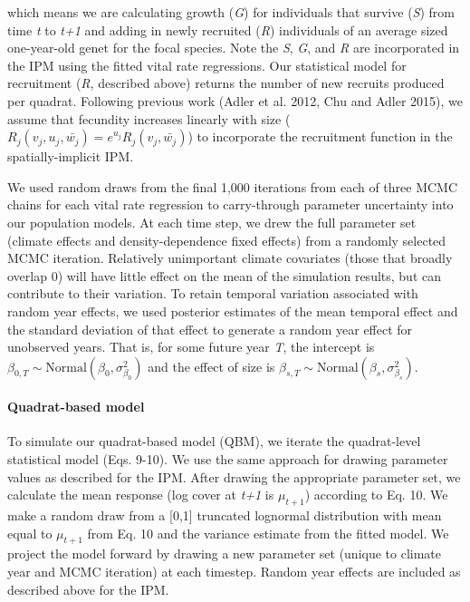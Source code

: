 \documentclass[12pt,]{article}
\begin{document}
which means we are calculating growth (\emph{G}) for individuals that
survive (\emph{S}) from time \emph{t} to \emph{t+1} and adding in newly
recruited (\emph{R}) individuals of an average sized one-year-old genet
for the focal species. Note the \emph{S}, \emph{G}, and \emph{R} are
incorporated in the IPM using the fitted vital rate regressions. Our
statistical model for recruitment (\emph{R}, described above) returns
the number of new recruits produced per quadrat. Following previous work
(Adler et al. 2012, Chu and Adler 2015), we assume that fecundity
increases linearly with size
(\(R_j(v_{j},u_{j},\bar{w_{j}}) = e^{u_j}R_j(v_{j},\bar{w_{j}})\)) to
incorporate the recruitment function in the spatially-implicit IPM.

We used random draws from the final 1,000 iterations from each of three
MCMC chains for each vital rate regression to carry-through parameter
uncertainty into our population models. At each time step, we drew the
full parameter set (climate effects and density-dependence fixed
effects) from a randomly selected MCMC iteration. Relatively unimportant
climate covariates (those that broadly overlap 0) will have little
effect on the mean of the simulation results, but can contribute to
their variation. To retain temporal variation associated with random
year effects, we used posterior estimates of the mean temporal effect
and the standard deviation of that effect to generate a random year
effect for unobserved years. That is, for some future year \emph{T}, the
intercept is
\(\beta_{0,T} \sim \text{Normal}(\beta_0, \sigma_{\beta_0}^2)\) and the
effect of size is
\(\beta_{s,T} \sim \text{Normal}(\beta_s, \sigma_{\beta_s}^2)\).

\paragraph{Quadrat-based model}\label{quadrat-based-model}

To simulate our quadrat-based model (QBM), we iterate the quadrat-level
statistical model (Eqs. 9-10). We use the same approach for drawing
parameter values as described for the IPM. After drawing the appropriate
parameter set, we calculate the mean response (log cover at \emph{t+1}
is \(\mu_{t+1}\)) according to Eq. 10. We make a random draw from a
{[}0,1{]} truncated lognormal distribution with mean equal to
\(\mu_{t+1}\) from Eq. 10 and the variance estimate from the fitted
model. We project the model forward by drawing a new parameter set
(unique to climate year and MCMC iteration) at each timestep. Random
year effects are included as described above for the IPM.
\end{document}
